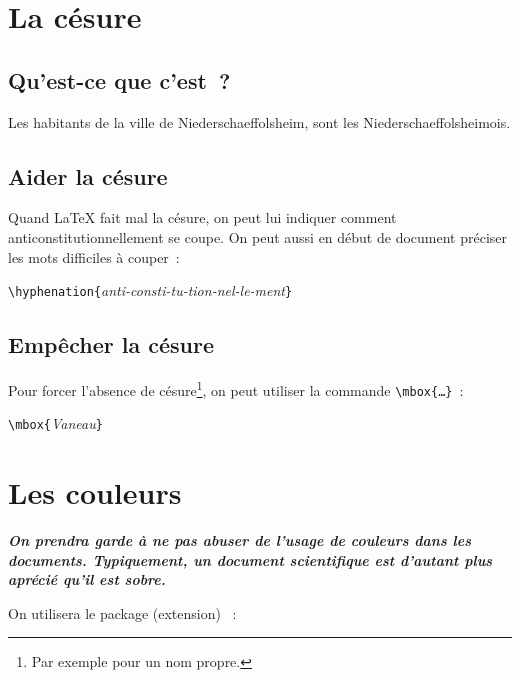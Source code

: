 \documentclass[a4paper, 11pt]{article}
\begin{document}
  \section{La césure}

        \subsection{Qu'est-ce que c'est~?}

            Les habitants de la ville de Niederschaeffolsheim, sont les Niederschaeffolsheimois.

        \subsection{Aider la césure}

            Quand LaTeX fait mal la césure, on peut lui indiquer comment anti\-consti\-tu\-tion\-nel\-le\-ment se coupe. On peut aussi en début de document préciser les mots difficiles à couper~:

            \begin{center}
                \verb!\hyphenation{!\textit{anti-consti-tu-tion-nel-le-ment}\verb!}!
            \end{center}

        \subsection{Empêcher la césure}

            Pour forcer l'absence de césure\footnote{Par exemple pour un nom propre.}, on peut utiliser la commande \verb!\mbox{…}!~:

            \begin{center}
                \verb!\mbox{!\textit{Vaneau}\verb!}!
            \end{center}

    \section{Les couleurs}

        \begin{center}
            \itshape\bfseries On prendra garde à ne pas abuser de l'usage de couleurs dans les documents. Typiquement, un document scientifique est d'autant plus aprécié qu'il est sobre.
        \end{center}

        On utilisera le package (extension) ~:
\end{document}
